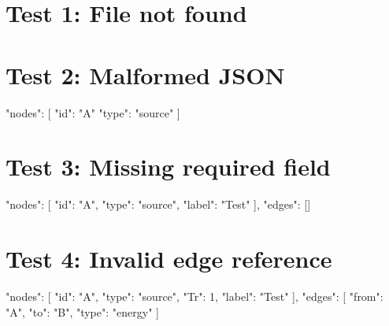\documentclass{article}
\begin{document}
\section{Test 1: File not found}

\section{Test 2: Malformed JSON}
\begin{energeseData}
{
  "nodes": [
    {"id": "A" "type": "source"}  %
  ]
}
\end{energeseData}

\section{Test 3: Missing required field}
\begin{energeseData}
{
  "nodes": [
    {"id": "A", "type": "source", "label": "Test"}
  ],
  "edges": []
}
\end{energeseData}

\section{Test 4: Invalid edge reference}
\begin{energeseData}
{
  "nodes": [
    {"id": "A", "type": "source", "Tr": 1, "label": "Test"}
  ],
  "edges": [
    {"from": "A", "to": "B", "type": "energy"}
  ]
}
\end{energeseData}
\end{document}
